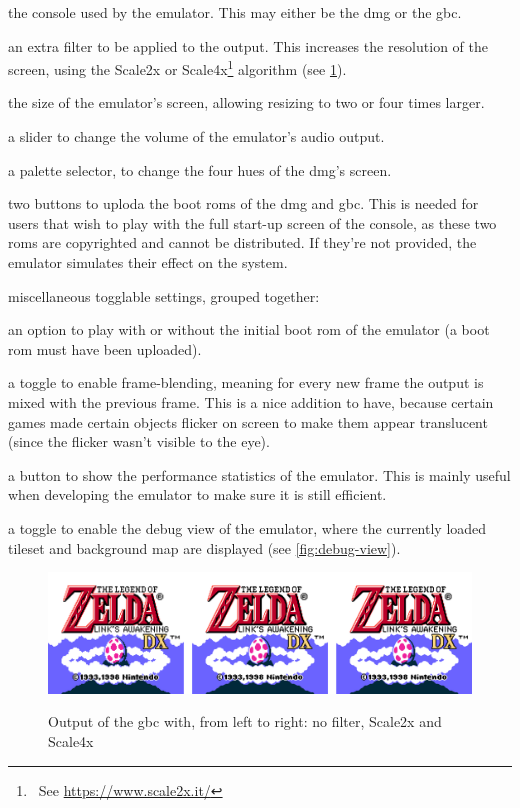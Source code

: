 \documentclass[11pt]{report}
\newcommand{\ftnt}[1]{\footnote{~See \url{#1}}}
\begin{document}
\begin{compactitem}
	\item the console used by the emulator. This may either be the \gls{dmg} or the \gls{gbc}.
	\item an extra filter to be applied to the output. This increases the resolution of the screen, using the Scale2x or Scale4x\ftnt{https://www.scale2x.it/} algorithm (see \ref{fig:scale-filter}).
	\item the size of the emulator's screen, allowing resizing to two or four times larger.
	\item a slider to change the volume of the emulator's audio output.
	\item a palette selector, to change the four hues of the \gls{dmg}'s screen.
	\item two buttons to uploda the boot \glspl{rom} of the \gls{dmg} and \gls{gbc}. This is needed for users that wish to play with the full start-up screen of the console, as these two \glspl{rom} are copyrighted and cannot be distributed. If they're not provided, the emulator simulates their effect on the system.
	\item miscellaneous togglable settings, grouped together:
	\begin{compactitem}
		\item an option to play with or without the initial boot \gls{rom} of the emulator (a boot \gls{rom} must have been uploaded).
		\item a toggle to enable frame-blending, meaning for every new frame the output is mixed with the previous frame. This is a nice addition to have, because certain games made certain objects flicker on screen to make them appear translucent (since the flicker wasn't visible to the eye).
		\item a button to show the performance statistics of the emulator. This is mainly useful when developing the emulator to make sure it is still efficient.
		\item a toggle to enable the debug view of the emulator, where the currently loaded tileset and background map are displayed (see \ref{fig:debug-view}).
	\end{compactitem}
\end{compactitem}

\begin{figure}[h]
    \centering
    \includegraphics[width=15cm]{images/scale-filter}\\
    \caption{Output of the \gls{gbc} with, from left to right: no filter, Scale2x and Scale4x}
    \label{fig:scale-filter}
\end{figure}
\end{document}
